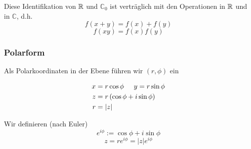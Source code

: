 Diese Identifikation von $\mathbb{R}$ und $\mathbb{C}_0$ ist verträglich mit den Operationen in $\mathbb{R}$ und in $\mathbb{C}$, d.h.
\[f(x+y)=f(x)+f(y)\]
\[f(xy)=f(x)f(y)\]
\subsubsection*{Polarform}
Als Polarkoordinaten in der Ebene führen wir $(r,\phi)$ ein

\begin{multicols}{2}
\begin{center}
\end{center}
\columnbreak
\vfill
\begin{align*}
x&=r\cos\phi\hspace{5mm} y=r\sin\phi\\
z&=r\left( \cos\phi + i\sin\phi\right)\\
r&=\left| z\right|
\end{align*}
\null\vfill
\end{multicols}


\begin{definition}{}
Wir definieren (nach Euler)\[e^{i\phi}:=\cos\phi+ i\sin\phi\]\[z=re^{i\phi}=\left| z\right|e^{i\phi}\]
\end{definition}

